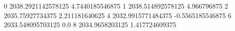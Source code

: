 0 2038.2921142578125 4.7440185546875
1 2038.514892578125 4.966796875
2 2035.75927734375 2.211181640625
4 2032.9915771484375 -0.5565185546875
6 2033.548095703125 0.0
8 2034.9658203125 1.417724609375
